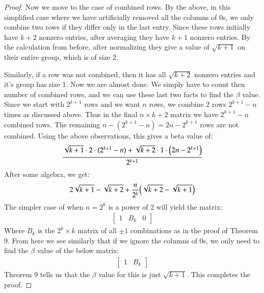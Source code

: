 \documentclass[12pt]{article}
\theoremstyle{definitionstyle}
\begin{document}
\begin{proof}
Now we move to the case of combined rows. By the above, in this simplified case where we have artificially removed all the columns of 0s, we only combine two rows if they differ only in the last entry. Since these rows initially have $k+2$ nonzero entries, after averaging they have $k+1$ nonzero entries. By the calculation from before, after normalizing they give a value of $\sqrt{k+1}$ on their entire group, which is of size 2. 

Similarly, if a row was not combined, then it has all $\sqrt{k+2}$ nonzero entries and it's group has size 1. Now we are almost done. We simply have to count then number of combined rows, and we can use these last two facts to find the $\beta$ value. Since we start with $2^{k+1}$ rows and we want $n$ rows, we combine 2 rows $2^{k+1} - n$ times as discussed above. Thus in the final $n \times k+2$ matrix we have $2^{k+1} - n$ combined rows. The remaining $n - (2^{k+1} - n) = 2n - 2^{k+1}$ rows are not combined. Using the above observations, this gives a beta value of:
\begin{align*}
    \frac{\sqrt{k+1} \cdot 2 \cdot (2^{k+1} - n) + \sqrt{k+2} \cdot 1 \cdot \qty(2n-2^{k+1})}{2^{k+1}}
\end{align*}
After some algebra, we get:
\begin{align*}
    2\sqrt{k+1} - \sqrt{k+2} + \frac{n}{2^k}\qty(\sqrt{k+2} - \sqrt{k+1})
\end{align*}
The simpler case of when $n = 2^k$ is a power of 2 will yield the matrix:
\begin{align*}
    \begin{bmatrix}
        1 & B_k & 0
    \end{bmatrix}
\end{align*}
Where $B_k$ is the $2^k \times k$ matrix of all $\pm 1$ combinations as in the proof of Theorem 9. From here we see similarly that if we ignore the columns of 0s, we only need to find the $\beta$ value of the below matrix:
\begin{align*}
    \begin{bmatrix}
        1 & B_k
    \end{bmatrix}
\end{align*}
Theorem 9 tells us that the $\beta$ value for this is just $\sqrt{k+1}$. This completes the proof.
\end{proof}
\end{document}
